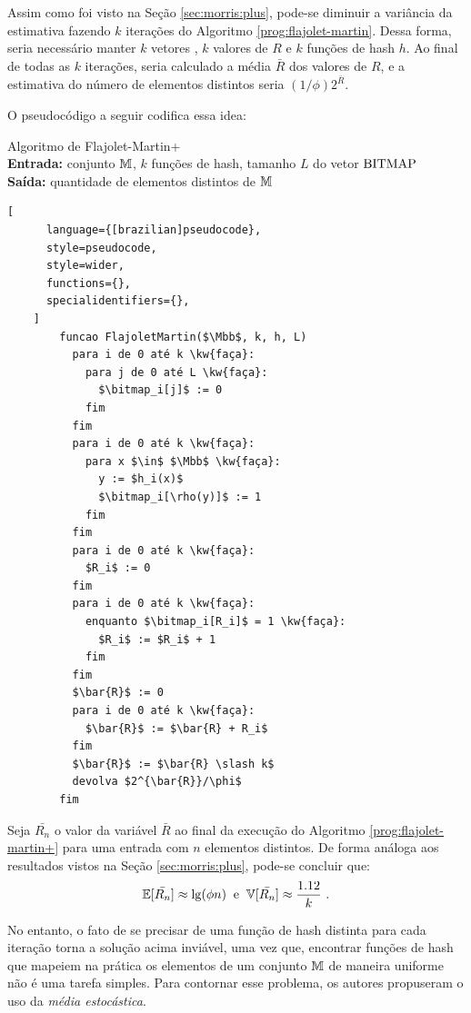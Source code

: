 Assim como foi visto na Seção \ref{sec:morris:plus}, pode-se diminuir a variância da estimativa fazendo $k$ iterações 
do Algoritmo \ref{prog:flajolet-martin}. Dessa forma, seria necessário manter $k$ vetores \bitmap, $k$ valores de $R$ e 
$k$ funções de hash $h$. Ao final de todas as $k$ iterações, seria calculado a média $\bar{R}$ dos valores de $R$, e a 
estimativa do número de elementos distintos seria $(1 \slash \phi) 2^{\bar{R}}$.

O pseudocódigo a seguir codifica essa idea:

\begin{programruledcaption}{
  Algoritmo de Flajolet-Martin+
  \\ \textbf{Entrada:} conjunto $\mathbb{M}$, $k$ funções de hash, tamanho $L$ do vetor $\text{BITMAP}$ 
  \\ \textbf{Saída:} quantidade de elementos distintos de $\mathbb{M}$
  \label{prog:flajolet-martin+}
  }
    \begin{lstlisting}[
      language={[brazilian]pseudocode},
      style=pseudocode,
      style=wider,
      functions={},
      specialidentifiers={},
    ]
        funcao FlajoletMartin($\Mbb$, k, h, L)
          para i de 0 até k \kw{faça}:
            para j de 0 até L \kw{faça}:
              $\bitmap_i[j]$ := 0
            fim
          fim
          para i de 0 até k \kw{faça}:
            para x $\in$ $\Mbb$ \kw{faça}:
              y := $h_i(x)$
              $\bitmap_i[\rho(y)]$ := 1
            fim
          fim
          para i de 0 até k \kw{faça}:
            $R_i$ := 0
          fim
          para i de 0 até k \kw{faça}:
            enquanto $\bitmap_i[R_i]$ = 1 \kw{faça}:
              $R_i$ := $R_i$ + 1
            fim
          fim
          $\bar{R}$ := 0
          para i de 0 até k \kw{faça}:
            $\bar{R}$ := $\bar{R} + R_i$ 
          fim
          $\bar{R}$ := $\bar{R} \slash k$
          devolva $2^{\bar{R}}/\phi$
        fim
    \end{lstlisting}
  \end{programruledcaption}

Seja $\bar{R_n}$ o valor da variável $\bar{R}$ ao final da execução do Algoritmo \ref{prog:flajolet-martin+} para uma
entrada com $n$ elementos distintos. De forma análoga aos resultados vistos na Seção \ref{sec:morris:plus}, pode-se
concluir que:
\[ \Ebb[\bar{R_n}] \approx \lg(\phi n)  \; \; \text{e}  \; \; \Vbb[\bar{R_n}] \approx \frac{1.12}{k} \ . \]


No entanto, o fato de se precisar de uma função de hash distinta para cada iteração torna a solução acima inviável, 
uma vez que, encontrar funções de hash que mapeiem na prática os elementos de um conjunto $\mathbb{M}$ de maneira
uniforme não é uma tarefa simples. Para contornar esse problema, os autores propuseram o uso da 
\textit{média estocástica}.


